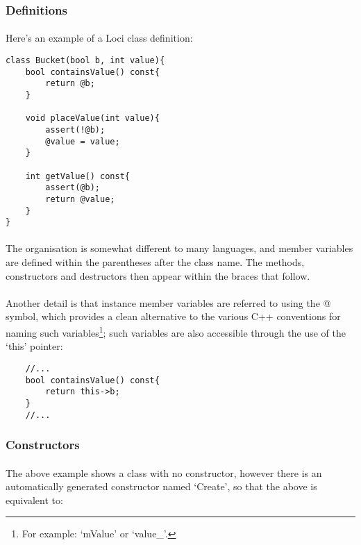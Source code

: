 \documentclass[12pt,twoside,notitlepage]{report}
\begin{document}
\subsubsection{Definitions}

\paragraph{}
Here's an example of a Loci class definition:


\begin{lstlisting}
class Bucket(bool b, int value){
	bool containsValue() const{
		return @b;
	}
	
	void placeValue(int value){
		assert(!@b);
		@value = value;
	}
	
	int getValue() const{
		assert(@b);
		return @value;
	}
}
\end{lstlisting}


\paragraph{}
The organisation is somewhat different to many languages, and member variables are defined within the parentheses after the class name. The methods, constructors and destructors then appear within the braces that follow.

\paragraph{}
Another detail is that instance member variables are referred to using the @ symbol, which provides a clean alternative to the various C++ conventions for naming such variables\footnote{For example: `mValue' or `value\_'.}; such variables are also accessible through the use of the `this' pointer:


\begin{lstlisting}
	//...
	bool containsValue() const{
		return this->b;
	}
	//...
\end{lstlisting}


\subsubsection{Constructors}

\paragraph{}
The above example shows a class with no constructor, however there is an automatically generated constructor named `Create', so that the above is equivalent to:
\end{document}
